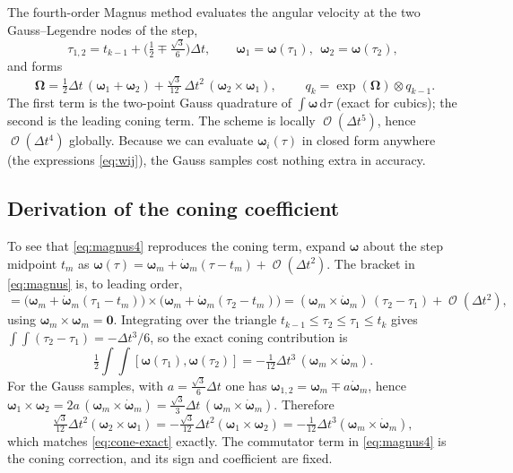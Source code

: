 \documentclass[11pt]{article}
\newcommand{\dd}{\,\mathrm{d}}
\newcommand{\Om}{\Omega}
\newcommand{\bw}{\boldsymbol{\omega}}
\newcommand{\Dt}{\Delta t}
\DeclareMathOperator{\Oo}{\mathcal{O}}
\begin{document}
The fourth-order Magnus method evaluates the angular velocity at the two Gauss--Legendre
nodes of the step,
\begin{equation}
  \tau_{1,2}=t_{k-1}+\Big(\tfrac12\mp\tfrac{\sqrt3}{6}\Big)\Dt,
  \qquad \bw_1=\bw(\tau_1),\ \ \bw_2=\bw(\tau_2),
\end{equation}
and forms
\begin{equation}
  \boxed{\;
  \boldsymbol{\Om}
   = \tfrac12\Dt\,(\bw_1+\bw_2)
   + \tfrac{\sqrt3}{12}\,\Dt^2\,(\bw_2\times\bw_1),
  \;}
  \qquad
  q_k=\exp(\boldsymbol{\Om})\otimes q_{k-1}.
  \label{eq:magnus4}
\end{equation}
The first term is the two-point Gauss quadrature of $\int\bw\dd\tau$ (exact for cubics);
the second is the leading coning term. The scheme is locally $\Oo(\Dt^5)$, hence
$\Oo(\Dt^4)$ globally. Because we can evaluate $\bw_i(\tau)$ in closed form anywhere (the
expressions \eqref{eq:wij}), the Gauss samples cost nothing extra in accuracy.

\subsection{Derivation of the coning coefficient}

To see that \eqref{eq:magnus4} reproduces the coning term, expand $\bw$ about the step
midpoint $t_m$ as $\bw(\tau)=\bw_m+\dot{\bw}_m(\tau-t_m)+\Oo(\Dt^2)$. The bracket in
\eqref{eq:magnus} is, to leading order,
\begin{equation}
  [\bw(\tau_1),\bw(\tau_2)]
  = \big(\bw_m+\dot{\bw}_m(\tau_1-t_m)\big)\times\big(\bw_m+\dot{\bw}_m(\tau_2-t_m)\big)
  = (\bw_m\times\dot{\bw}_m)\,(\tau_2-\tau_1)+\Oo(\Dt^2),
\end{equation}
using $\bw_m\times\bw_m=\mathbf0$. Integrating over the triangle
$t_{k-1}\le\tau_2\le\tau_1\le t_k$ gives $\int\!\!\int(\tau_2-\tau_1)=-\Dt^3/6$, so the exact
coning contribution is
\begin{equation}
  \tfrac12\!\int\!\!\int[\bw(\tau_1),\bw(\tau_2)]
   = -\tfrac{1}{12}\Dt^3\,(\bw_m\times\dot{\bw}_m).
  \label{eq:cone-exact}
\end{equation}
For the Gauss samples, with $a=\tfrac{\sqrt3}{6}\Dt$ one has
$\bw_{1,2}=\bw_m\mp a\dot{\bw}_m$, hence
$\bw_1\times\bw_2 = 2a\,(\bw_m\times\dot{\bw}_m)=\tfrac{\sqrt3}{3}\Dt\,(\bw_m\times\dot{\bw}_m)$.
Therefore
\begin{equation}
  \tfrac{\sqrt3}{12}\Dt^2(\bw_2\times\bw_1)
  = -\tfrac{\sqrt3}{12}\Dt^2(\bw_1\times\bw_2)
  = -\tfrac{1}{12}\Dt^3(\bw_m\times\dot{\bw}_m),
\end{equation}
which matches \eqref{eq:cone-exact} exactly. The commutator term in \eqref{eq:magnus4} is
the coning correction, and its sign and coefficient are fixed.
\end{document}
